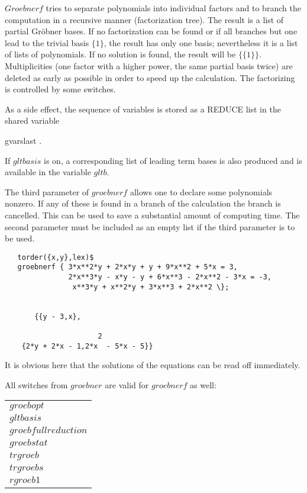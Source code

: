 $Groebnerf$ tries to separate polynomials into individual factors and
to branch the computation in a recursive manner (factorization tree).
The result is a list of partial Gr\"obner bases. If no factorization can
be found or if all branches but one lead to the trivial basis $\{1\}$,
the result has only one basis; nevertheless it is a list of lists of
polynomials. If no solution is found, the result will be $\{\{1\}\}$.
Multiplicities (one factor with a higher power, the same partial basis
twice) are deleted as early as possible in order to speed up the
calculation. The factorizing is controlled by some switches.

As a side effect, the sequence of variables is stored as a REDUCE list in
the shared variable
\begin{center}
gvarslast .
\end{center}
If $gltbasis$ is on, a corresponding list of leading term bases is
also produced and is available in the variable $gltb$.

The third parameter of $groebnerf$ allows one to declare some polynomials
nonzero. If any of these is found in a branch of the calculation
the branch is cancelled. This can be used to save a substantial amount
of computing time. The second parameter must be included as an
empty list if the third parameter is to be used.

\begin{verbatim}
   torder({x,y},lex)$
   groebnerf { 3*x**2*y + 2*x*y + y + 9*x**2 + 5*x = 3,
               2*x**3*y - x*y - y + 6*x**3 - 2*x**2 - 3*x = -3,
                x**3*y + x**2*y + 3*x**3 + 2*x**2 \};


       {{y - 3,x},

                      2
    {2*y + 2*x - 1,2*x  - 5*x - 5}}
\end{verbatim}

It is obvious here that the solutions of the equations can be read
off immediately.

All switches from $groebner$ are valid for $groebnerf$ as well:
  
  
 
\begin{center}
\begin{tabular}{l}
$groebopt$ \\
$gltbasis$ \\
$groebfullreduction$ \\
$groebstat$ \\
$trgroeb$ \\
$trgroebs$ \\
$rgroeb1$
\end{tabular}
\end{center}

